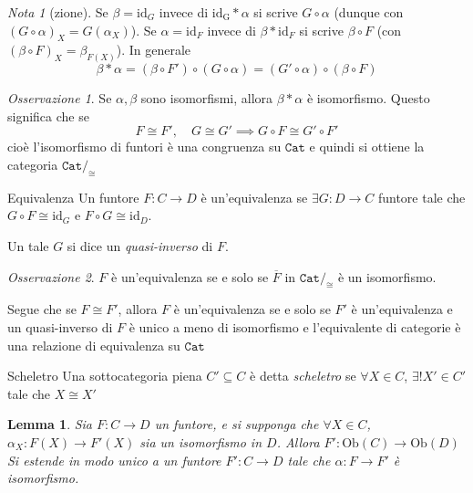 \documentclass[notitlepage]{report}
\newcounter{theo}[section]\setcounter{theo}{0}
\numberwithin{equation}{section}
\theoremstyle{plain}
\newtheorem{lemma}[theo]{Lemma}
\theoremstyle{definition}
\theoremstyle{remark}
\newtheorem*{note}{Nota}
\newtheorem*{remark}{Osservazione}
\begin{document}
\begin{note}[zione]
    Se \(\beta = \mathrm{id}_G \) invece di \(\mathrm{id_G} * \alpha\) si scrive
    \(G \circ \alpha\) (dunque con \({(G \circ \alpha)}_X = G{(\alpha_X)}\)). Se
    \(\alpha = \mathrm{id}_F\) invece di \(\beta * \mathrm{id}_F\) si scrive \(\beta \circ F\) (con \({(\beta \circ F)}_X = \beta_{F{(X)}} \)). In generale 
    \[
      \beta * \alpha = {(\beta \circ F')} \circ {(G \circ \alpha)} = {(G' \circ
      \alpha)} \circ {(\beta \circ F)}
    \]
\end{note}
\begin{remark}{}
    Se \(\alpha, \beta\) sono isomorfismi, allora \(\beta * \alpha\) è
    isomorfismo. Questo significa che se 
    \[
      F \cong F', \quad G \cong G' \implies G \circ F \cong G' \circ F'
    \]
    cioè l'isomorfismo di funtori è una congruenza su \(
    \mathtt{Cat}\) e quindi si ottiene la categoria \(\mathtt{Cat} /_{\cong}\)
\end{remark}
\begin{definition}{Equivalenza}
    Un funtore \(F: C \to D\) è un'equivalenza se \(\exists G : D \to C\)
    funtore tale che \(G \circ F \cong \mathrm{id}_G\) e \(F \circ G \cong \mathrm{id}_D\).

    Un tale \(G\) si dice un \emph{quasi-inverso} di \(F\).
\end{definition}
\begin{remark}{}
    \(F\) è un'equivalenza se e solo se \(\overline{F} \text{ in } \mathtt{Cat}/_{\cong} \) è un isomorfismo.
\end{remark}

Segue che se \(F \cong F'\), allora \(F\) è un'equivalenza se e solo se \(F'\) è
un'equivalenza e un quasi-inverso di \(F\) è unico a meno di isomorfismo e
l'equivalente di categorie è una relazione di equivalenza su \(\mathtt{Cat}\) 

\begin{definition}{Scheletro}
    Una sottocategoria piena \(C' \subseteq C \) è detta \emph{scheletro} se \(\forall X \in C\), \(\exists ! X' \in C'\) tale che \(X \cong X'\) 
\end{definition}

\begin{lemma}{}\label{lem:ext-scheletro}
    Sia \(F: C\to D\) un funtore, e si supponga che \(\forall X \in C\), \(\alpha_X : F{(X)} \to F'{(X)}\) sia un isomorfismo in \(D\). Allora \(F' : \mathrm{Ob}{(C)} \to \mathrm{Ob}{(D)}\) Si estende in modo unico a un funtore \(F' : C \to D\) tale che \(\alpha : F \to F'\) è isomorfismo.
\end{lemma}
\end{document}
